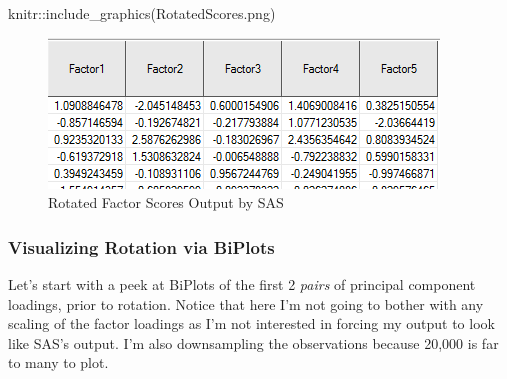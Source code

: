 \documentclass[
]{article}
\newenvironment{Shaded}{\begin{snugshade}}{\end{snugshade}}
\newcommand{\AttributeTok}[1]{\textcolor[rgb]{0.77,0.63,0.00}{#1}}
\newcommand{\DecValTok}[1]{\textcolor[rgb]{0.00,0.00,0.81}{#1}}
\newcommand{\FloatTok}[1]{\textcolor[rgb]{0.00,0.00,0.81}{#1}}
\newcommand{\FunctionTok}[1]{\textcolor[rgb]{0.00,0.00,0.00}{#1}}
\newcommand{\NormalTok}[1]{#1}
\newcommand{\SpecialCharTok}[1]{\textcolor[rgb]{0.00,0.00,0.00}{#1}}
\newcommand{\StringTok}[1]{\textcolor[rgb]{0.31,0.60,0.02}{#1}}
\theoremstyle{definition}
\theoremstyle{definition}
\theoremstyle{definition}
\theoremstyle{definition}
\theoremstyle{remark}
\begin{document}
\begin{Shaded}
\begin{Highlighting}[]
\NormalTok{knitr}\SpecialCharTok{::}\FunctionTok{include\_graphics}\NormalTok{(}\StringTok{\textquotesingle{}RotatedScores.png\textquotesingle{}}\NormalTok{)}
\end{Highlighting}
\end{Shaded}

\begin{figure}

{\centering \includegraphics[width=1\linewidth]{RotatedScores} 

}

\caption{Rotated Factor Scores Output by SAS}\label{fig:rotscores}
\end{figure}

\hypertarget{visualizing-rotation-via-biplots}{%
\subsubsection{Visualizing Rotation via BiPlots}\label{visualizing-rotation-via-biplots}}

Let's start with a peek at BiPlots of the first 2 \textit{pairs} of principal component loadings, prior to rotation. Notice that here I'm not going to bother with any scaling of the factor loadings as I'm not interested in forcing my output to look like SAS's output. I'm also downsampling the observations because 20,000 is far to many to plot.

\begin{Shaded}
\end{Shaded}
\end{document}
